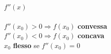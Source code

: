 \documentclass[10pt]{article}
\begin{document}
\begin{enumerate}
\begin{multicols}{2}
		$f''(x)$\\\\
		$f''(x_0) > 0 \Rightarrow f(x_0)$ \textbf{convessa}\\
		$f''(x_0) < 0 \Rightarrow f(x_0)$ \textbf{concava}\\
		$x_0$ \textbf{flesso} se $f''(x_0) = 0$
	\end{multicols}
\end{enumerate}
\end{document}
